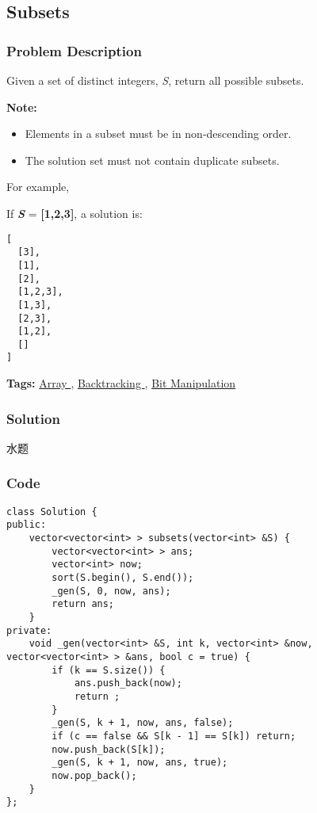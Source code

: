 \documentclass{article}
\begin{document}
\begin{CJK*}{UTF8}{gkai}
\subsection{ Subsets }
\label{ Subsets }

\subsubsection*{Problem Description}
Given a set of distinct integers, \emph{S}, return all possible subsets.

\textbf{Note:}



\begin{itemize}
\item Elements in a subset must be in non-descending order.
\item The solution set must not contain duplicate subsets.
\end{itemize}

For example,


If \textbf{\emph{S}} = \textbf{[1,2,3]}, a solution is:

\begin{verbatim}
[
  [3],
  [1],
  [2],
  [1,2,3],
  [1,3],
  [2,3],
  [1,2],
  []
]
\end{verbatim}

\textbf{Tags: }
\hyperref[ Array ]{ Array },  \hyperref[ Backtracking ]{ Backtracking },  \hyperref[ Bit Manipulation ]{ Bit Manipulation }



\subsubsection*{Solution}
水题

\subsubsection*{Code}
\begin{lstlisting}
class Solution {
public:
    vector<vector<int> > subsets(vector<int> &S) {
        vector<vector<int> > ans;
        vector<int> now;
        sort(S.begin(), S.end());
        _gen(S, 0, now, ans);
        return ans;
    }
private:
    void _gen(vector<int> &S, int k, vector<int> &now, vector<vector<int> > &ans, bool c = true) {
        if (k == S.size()) {
            ans.push_back(now);
            return ;
        }
        _gen(S, k + 1, now, ans, false);
        if (c == false && S[k - 1] == S[k]) return;
        now.push_back(S[k]);
        _gen(S, k + 1, now, ans, true);
        now.pop_back();
    }
}; 
\end{lstlisting}



\end{CJK*}
\end{document}

